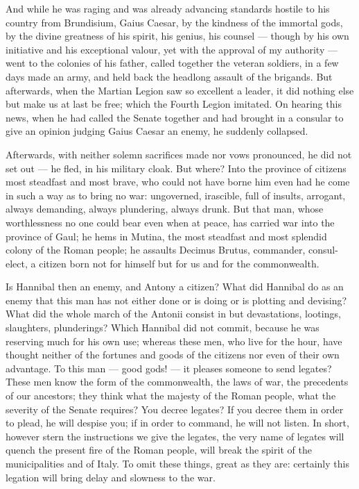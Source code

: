  And while he was raging and was already advancing standards hostile to his country from Brundisium, Gaius Caesar, by the kindness of the immortal gods, by the divine greatness of his spirit, his genius, his counsel --- though by his own initiative and his exceptional valour, yet with the approval of my authority --- went to the colonies of his father, called together the veteran soldiers, in a few days made an army, and held back the headlong assault of the brigands. But afterwards, when the Martian Legion saw so excellent a leader, it did nothing else but make us at last be free; which the Fourth Legion imitated. On hearing this news, when he had called the Senate together and had brought in a consular to give an opinion judging Gaius Caesar an enemy, he suddenly collapsed.

 Afterwards, with neither solemn sacrifices made nor vows pronounced, he did not set out --- he fled, in his military cloak. But where? Into the province of citizens most steadfast and most brave, who could not have borne him even had he come in such a way as to bring no war: ungoverned, irascible, full of insults, arrogant, always demanding, always plundering, always drunk. But that man, whose worthlessness no one could bear even when at peace, has carried war into the province of Gaul; he hems in Mutina, the most steadfast and most splendid colony of the Roman people; he assaults Decimus Brutus, commander, consul-elect, a citizen born not for himself but for us and for the commonwealth.

 Is Hannibal then an enemy, and Antony a citizen? What did Hannibal do as an enemy that this man has not either done or is doing or is plotting and devising? What did the whole march of the Antonii consist in but devastations, lootings, slaughters, plunderings? Which Hannibal did not commit, because he was reserving much for his own use; whereas these men, who live for the hour, have thought neither of the fortunes and goods of the citizens nor even of their own advantage. To this man --- good gods! --- it pleases someone to send legates? These men know the form of the commonwealth, the laws of war, the precedents of our ancestors; they think what the majesty of the Roman people, what the severity of the Senate requires? You decree legates? If you decree them in order to plead, he will despise you; if in order to command, he will not listen. In short, however stern the instructions we give the legates, the very name of legates will quench the present fire of the Roman people, will break the spirit of the municipalities and of Italy. To omit these things, great as they are: certainly this legation will bring delay and slowness to the war.

